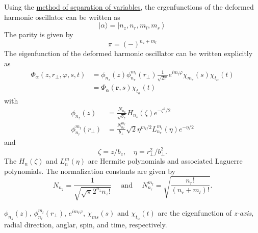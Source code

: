 Using the \underline{method of separation of variables}, the ergenfunctions of the deformed harmonic oscillator can be written as
\begin{equation}
    |\alpha\rangle=\left|n_{z}, n_{r}, m_{l}, m_{s}\right\rangle  \label{oc_eigenfun}
\end{equation}
The parity is given by 
\begin{equation}
\pi = (-)^{n_z + m_l}
\end{equation}
The eigenfunction of the deformed harmonic oscillator can be written explicitly as
\begin{equation}
\begin{aligned}
    \Phi_{\alpha} \left( z, r_{\perp}, \varphi, s, t \right) &= \phi_{n_{z}}(z) \phi_{n_{r}}^{m_{l}} \left( r_{\perp} \right) \frac{1}{\sqrt{2 \pi}} e^{i m_{l} \varphi} \chi_{m_s}(s) \chi_{t_{\alpha}}(t) \\
    &=\Phi_{\alpha}(\boldsymbol{r}, s) \chi_{t_{\alpha}}(t) \label{oc_ergenfun_exp}
\end{aligned}
\end{equation}
with
\begin{align}
    \phi_{n_{z}}(z) &= \frac{N_{n_{z}}}{\sqrt{b_{z}}} H_{n_{z}}(\zeta) e^{-\zeta^{2} / 2} \\
    \phi_{n_r}^{m_l}(r_{\perp}) &= \frac{ N_{n_r}^{m_l} }{ b_{\perp} } \sqrt{2} \eta^{m_l/2} L_{n_r}^{m_l}(\eta) e^{-\eta/2}
\end{align}
and
\begin{equation}
    \zeta = z/b_z, \quad \eta = r_\perp^2 / b_{\perp}^2.
\end{equation}
The $H_n(\zeta)$ and $L_n^m(\eta)$ are Hermite polynomials and associated Laguerre polynomials. The normalization constants are given by 
\begin{equation}
    N_{n_{z}}=\frac{1}{\sqrt{\sqrt{\pi} 2^{n_{z}} n_{z} !}} \quad \text { and } \quad N_{n_{r}}^{m_{l}}=\sqrt{\frac{n_{r} !}{\left(n_{r}+m_{l}\right) !}} .
\end{equation}
\begin{note}
  $\phi_{n_{z}}(z)$, $\phi_{n_{r}}^{m_{l}} ( r_{\perp})$, $e^{i m_{l} \varphi}$, $\chi_{m s}(s)$ and $\chi_{t_{\alpha}}(t)$ are the eigenfunction of \textit{z-axis}, radial direction, anglar, spin, and time, respectively.
\end{note}

